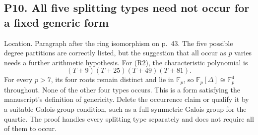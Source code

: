 \documentclass[10pt]{article}
\begin{document}
\subsection*{P10. All five splitting types need not occur for a fixed generic form}
Location. Paragraph after the ring isomorphism on p. 43. The five possible degree partitions are correctly listed, but the suggestion that all occur as \(p\) varies needs a further arithmetic hypothesis. For (R2), the characteristic polynomial is \[(T+9)(T+25)(T+49)(T+81).\] For every \(p>7\), its four roots remain distinct and lie in \(\mathbb F_p\), so \(\mathbb F_p[\Delta]\cong\mathbb F_p^4\) throughout. None of the other four types occurs. This is a form satisfying the manuscript’s definition of genericity. Delete the occurrence claim or qualify it by a suitable Galois-group condition, such as a full symmetric Galois group for the quartic. The proof handles every splitting type separately and does not require all of them to occur.\par
\end{document}
